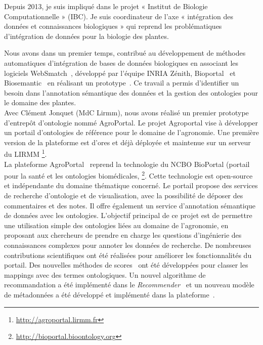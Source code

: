 Depuis 2013, je suis impliqué dans le projet « Institut de Biologie Computationnelle » (IBC). Je suis coordinateur de l’axe « intégration des données et connaissances biologiques » qui reprend les problématiques d’intégration de données pour la biologie des plantes.

Nous avons dans un premier temps, contribué au développement de méthodes automatiques d’intégration de bases de données biologiques en associant les logiciels WebSmatch~\cite{Coletta2012}, développé par l’équipe INRIA Zénith, Bioportal~\cite{Noy2009,Melzi} et Biosemantic~\cite{wollbrett2013clever} en réalisant un prototype~\cite{castanier2014semantic}. Ce travail a permis d’identifier un besoin dans l’annotation sémantique des données et la gestion des ontologies pour le domaine des plantes. \\

Avec Clément Jonquet (MdC Lirmm), nous avons réalisé un premier prototype d’entrepôt d’ontologie nommé AgroPortal. Le projet Agroportal vise à développer un portail d'ontologies de référence pour le domaine de l'agronomie. Une première version de la plateforme est d’ores et déjà déployée et maintenue sur un serveur du LIRMM \footnote{\url{http://agroportal.lirmm.fr}}. \\

La plateforme AgroPortal~\cite{Jonquet2016} reprend la technologie du NCBO BioPortal (portail pour la santé et les ontologies biomédicales, \footnote{\url{http://bioportal.bioontology.org}}. Cette technologie est open-source et indépendante du domaine thématique concerné. Le portail propose des services de recherche d'ontologie et de visualisation, avec la possibilité de déposer des commentaires et des notes. Il offre également un service d'annotation sémantique de données avec les ontologies. L'objectif principal de ce projet est de permettre une utilisation simple des ontologies liées au domaine de l'agronomie, en proposant aux chercheurs de prendre en charge les questions d'ingénierie des connaissances complexes pour annoter les données de recherche. De nombreuses contributions scientifiques ont été réalisées pour améliorer les fonctionnalités du portail. Des nouvelles méthodes de scores~\cite{Melzi} ont été développées pour classer les mappings avec des termes ontologiques. Un nouvel algorithme de recommandation a été implémenté dans le \textit{Recommender}~\cite{RomeroJOGPM16} et un nouveau modèle de métadonnées a été développé et implémenté dans la plateforme~\cite{toulet:lirmm-01397388}.\\

